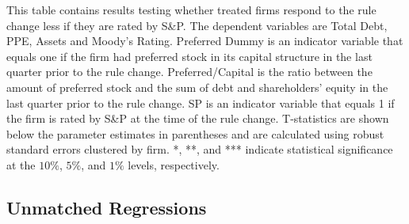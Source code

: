\documentclass[a4paper, 12pt]{article}
\begin{document}
\begin{table}[htbp]
\caption{\textbf{The Effect of S\&P Rating on Response to Rule Change}
} \label{table_cross}
\begin{singlespace}
\begin{small}

\noindent This table contains results testing whether treated firms respond to the rule change less if they are rated by S\&P.  The dependent variables are Total Debt, PPE, Assets and Moody's Rating. Preferred Dummy is an indicator variable that equals one if the firm had preferred stock in its capital structure in the last quarter prior to the rule change. Preferred/Capital is the ratio between the amount of preferred stock and the sum of debt and shareholders' equity in the last quarter prior to the rule change. SP is an indicator variable that equals 1 if the firm is rated by S\&P at the time of the rule change. T-statistics are shown below the parameter estimates in parentheses and are calculated using robust standard errors clustered by firm. *, **, and *** indicate statistical significance at the $10\%$, $5\%$, and $1\%$ levels, respectively.

\end{small}
\end{singlespace}
\vspace{3mm}
\small
  \centering
\end{table}


\clearpage

\newpage

\subsection*{Unmatched Regressions}
\end{document}
